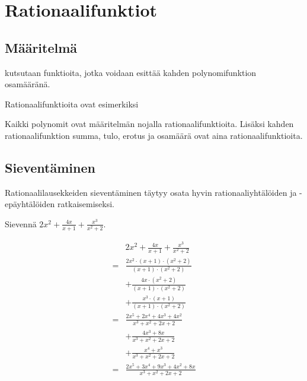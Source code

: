 \chapter{Rationaalifunktiot}

\section{Määritelmä}

 kutsutaan funktioita, jotka voidaan esittää kahden
polynomifunktion osamääränä.

\begin{esimerkki}
	Rationaalifunktioita ovat esimerkiksi
	\begin{alakohdat}
	\end{alakohdat}
\end{esimerkki}

Kaikki polynomit ovat määritelmän nojalla rationaalifunktioita. Lisäksi kahden rationaalifunktion summa, tulo, erotus ja osamäärä ovat aina rationaalifunktioita.

\section{Sieventäminen}

Rationaalilausekkeiden sieventäminen täytyy osata hyvin rationaaliyhtälöiden ja -epäyhtälöiden
ratkaisemiseksi.

\begin{esimerkki}
	Sievennä $2x^2 + \frac{4x}{x+1} + \frac{x^3}{x^2+2}$.
	\begin{esimratk}
		\begin{align*}
			  &2x^2 + \frac{4x}{x+1} + \frac{x^3}{x^2+2} \\
			= &\frac{2x^2 \cdot (x+1) \cdot (x^2+2)}{(x+1) \cdot (x^2+2)} \\
			  &+ \frac{4x \cdot (x^2+2)}{(x+1) \cdot (x^2+2)} \\
			  &+ \frac{x^3 \cdot (x+1)}{(x+1) \cdot (x^2+2)} \\
			= &\frac{2x^5 + 2x^4 + 4x^3 + 4x^2}{x^3+x^2+2x+2} \\
			  &+ \frac{4x^3+8x}{x^3+x^2+2x+2} \\
			  &+ \frac{x^4+x^3}{x^3+x^2+2x+2} \\
			= &\frac{2x^5+3x^4+9x^3+4x^2+8x}{x^3+x^2+2x+2}
		\end{align*}
	\end{esimratk}
\end{esimerkki}

